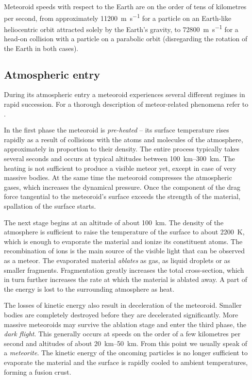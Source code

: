     Meteoroid speeds with respect to the Earth are on the order of tens of kilometres per second,
    from approximately \SI{11200}{\metre\per\second} for a particle on an Earth-like
    heliocentric orbit attracted solely by the Earth's gravity, to \SI{72800}{\metre\per\second}
    for a head-on collision with a particle on a parabolic orbit (disregarding the rotation of the Earth in both cases).

    \subsection{Atmospheric entry} \label{ile}
        During its atmospheric entry a meteoroid experiences several different regimes in rapid succession.
        For a thorough description of meteor-related phenomena refer to \citep{ceplecha+1998}.

        In the first phase the meteoroid is \emph{pre-heated} -- its surface temperature rises rapidly
        as a result of collisions with the atoms and molecules of the atmosphere,
        approximately in proportion to their density.
        The entire process typically takes several seconds and occurs at typical altitudes
        between \SIrange{100}{300}{\kilo\metre}. The heating is not sufficient to produce a visible meteor yet,
        except in case of very massive bodies. At the same time the meteoroid compresses
        the atmospheric gases, which increases the dynamical pressure. Once the component
        of the drag force tangential to the meteoroid's surface exceeds the strength of the material,
        spallation of the surface starts.

        The next stage begins at an altitude of about \SI{100}{\kilo\metre}.
        The density of the atmosphere is sufficient to raise the temperature of the surface
        to about \SI{2200}{\kelvin}, which is enough to evaporate the material and ionize its constituent atoms.
        The recombination of ions is the main source of the visible light that can be observed as a meteor.
        The evaporated material \emph{ablates} as gas, as liquid droplets or as smaller fragments.
        Fragmentation greatly increases the total cross-section, which in turn
        further increases the rate at which the material is ablated away.
        A part of the energy is lost to the surrounding atmosphere as heat.

        The losses of kinetic energy also result in deceleration of the meteoroid.
        Smaller bodies are completely destroyed before they are decelerated significantly.
        More massive meteoroids may survive the ablation stage and enter the third phase, the \emph{dark flight}.
        This generally occurs at speeds on the order of a few kilometres per second and altitudes of about \SIrange{20}{50}{\kilo\metre}.
        From this point we usually speak of a \emph{meteorite}.
        The kinetic energy of the oncoming particles is no longer sufficient to evaporate the material
        and the surface is rapidly cooled to ambient temperatures, forming a fusion crust.

